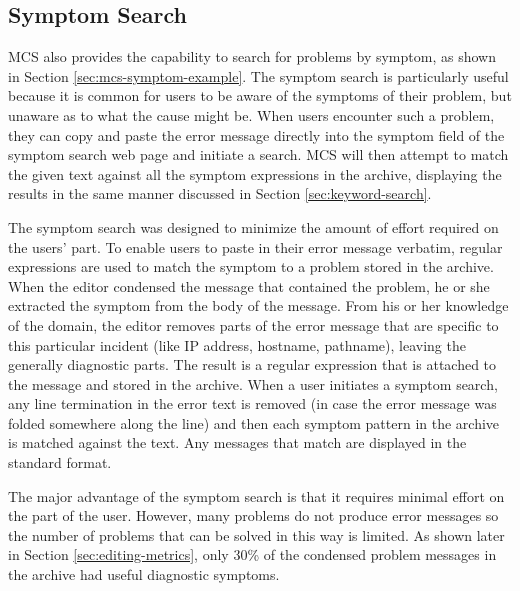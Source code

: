 \subsection{Symptom Search}
\label{sec:symptom-search}
MCS also provides the capability to search for problems by symptom, as shown in
Section \ref{sec:mcs-symptom-example}. The symptom search is particularly
useful because it is common for users to be aware of the symptoms of their
problem, but unaware as to what the cause might be. When users encounter such a
problem, they can copy and paste the error message directly into the symptom
field of the symptom search web page and initiate a search. MCS will then
attempt to match the given text against all the symptom expressions in the
archive, displaying the results in the same manner discussed in Section
\ref{sec:keyword-search}.

The symptom search was designed to minimize the amount of effort required on
the users' part. To enable users to paste in their error message verbatim,
regular expressions are used to match the symptom to a problem stored in the
archive. When the editor condensed the message that contained the problem, he
or she extracted the symptom from the body of the message. From his or her
knowledge of the domain, the editor removes parts of the error message that are
specific to this particular incident (like IP address, hostname, pathname),
leaving the generally diagnostic parts. The result is a regular expression that
is attached to the message and stored in the archive. When a user initiates a
symptom search, any line termination in the error text is removed (in case the
error message was folded somewhere along the line) and then each symptom
pattern in the archive is matched against the text. Any messages that match are
displayed in the standard format.

The major advantage of the symptom search is that it requires minimal effort on
the part of the user. However, many problems do not produce error messages so
the number of problems that can be solved in this way is limited. As shown
later in Section \ref{sec:editing-metrics}, only 30\% of the condensed problem
messages in the archive had useful diagnostic symptoms.

